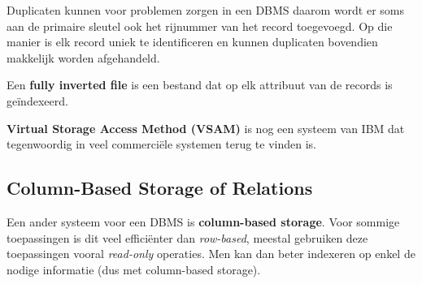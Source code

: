 Duplicaten kunnen voor problemen zorgen in een DBMS daarom wordt er soms aan de primaire sleutel ook het rijnummer van het record toegevoegd. Op die manier is elk record uniek te identificeren en kunnen duplicaten bovendien makkelijk worden afgehandeld.

Een \textbf{fully inverted file} is een bestand dat op elk attribuut van de records is ge\"indexeerd.

\textbf{Virtual Storage Access Method (VSAM)} is nog een systeem van IBM dat tegenwoordig in veel commerci\"ele systemen terug te vinden is.


\subsection{Column-Based Storage of Relations}
Een ander systeem voor een DBMS is \textbf{column-based storage}. Voor sommige toepassingen is dit veel effici\"enter dan \textit{row-based}, meestal gebruiken deze toepassingen vooral \textit{read-only} operaties. Men kan dan beter indexeren op enkel de nodige informatie (dus met column-based storage).